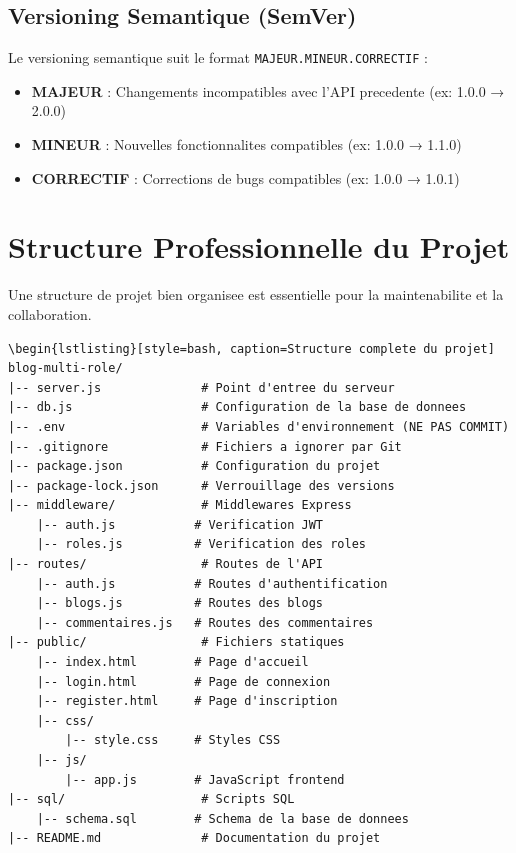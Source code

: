 \documentclass[a4paper,12pt]{book}
\begin{document}
\subsection{Versioning Semantique (SemVer)}

Le versioning semantique suit le format \texttt{MAJEUR.MINEUR.CORRECTIF} :

\begin{itemize}
    \item \textbf{MAJEUR} : Changements incompatibles avec l'API precedente (ex: 1.0.0 → 2.0.0)
    \item \textbf{MINEUR} : Nouvelles fonctionnalites compatibles (ex: 1.0.0 → 1.1.0)
    \item \textbf{CORRECTIF} : Corrections de bugs compatibles (ex: 1.0.0 → 1.0.1)
\end{itemize}

\section{Structure Professionnelle du Projet}

Une structure de projet bien organisee est essentielle pour la maintenabilite et la collaboration.

\begin{lstlisting}[style=bash, caption=Structure complete du projet]
\begin{lstlisting}[style=bash, caption=Structure complete du projet]
blog-multi-role/
|-- server.js              # Point d'entree du serveur
|-- db.js                  # Configuration de la base de donnees
|-- .env                   # Variables d'environnement (NE PAS COMMIT)
|-- .gitignore             # Fichiers a ignorer par Git
|-- package.json           # Configuration du projet
|-- package-lock.json      # Verrouillage des versions
|-- middleware/            # Middlewares Express
    |-- auth.js           # Verification JWT
    |-- roles.js          # Verification des roles
|-- routes/                # Routes de l'API
    |-- auth.js           # Routes d'authentification
    |-- blogs.js          # Routes des blogs
    |-- commentaires.js   # Routes des commentaires
|-- public/                # Fichiers statiques
    |-- index.html        # Page d'accueil
    |-- login.html        # Page de connexion
    |-- register.html     # Page d'inscription
    |-- css/
        |-- style.css     # Styles CSS
    |-- js/
        |-- app.js        # JavaScript frontend
|-- sql/                   # Scripts SQL
    |-- schema.sql        # Schema de la base de donnees
|-- README.md              # Documentation du projet
\end{lstlisting}
\end{document}

